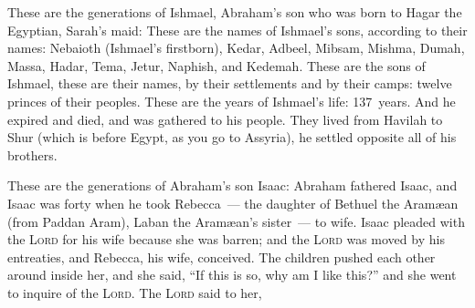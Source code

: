 \begin{inparaenum}
     These are the generations of Ishmael, Abraham's son who was born to Hagar the Egyptian, Sarah's maid:%
     These are the names of Ishmael's sons, according to their names: Nebaioth (Ishmael's firstborn), Kedar, Adbeel, Mibsam,%
     Mishma, Dumah, Massa,%
     Hadar, Tema, Jetur, Naphish, and Kedemah.%
     These are the sons of Ishmael, these are their names, by their settlements and by their camps: twelve princes of their peoples.%
     These are the years of Ishmael's life: 137~years. And he expired and died, and was gathered to his people.%
     They lived from Havilah to Shur (which is before Egypt, as you go to Assyria), he settled opposite all of his brothers.%
    
     These are the generations of Abraham's son Isaac: Abraham fathered Isaac,%
     and Isaac was forty when he took Rebecca~--- the daughter of Bethuel the Aram\ae an (from Paddan Aram), Laban the Aram\ae an's sister~--- to wife.%
     Isaac pleaded with the \textsc{Lord} for his wife because she was barren; and the \textsc{Lord} was moved by his entreaties, and Rebecca, his wife, conceived.%
     The children pushed each other around inside her, and she said, ``If this is so, why am I like this?'' and she went to inquire of the \textsc{Lord}.%
     The \textsc{Lord} said to her,\smallskip%
    
    
    

\end{inparaenum}
